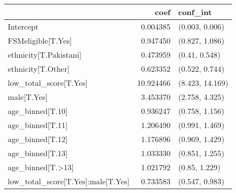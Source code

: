 \begin{tabular}{lrl}
\toprule
{} &       coef &         conf\_int \\
\midrule
Intercept                          &   0.004385 &   (0.003, 0.006) \\
FSMeligible[T.Yes]                 &   0.947450 &   (0.827, 1.086) \\
ethnicity[T.Pakistani]             &   0.473959 &    (0.41, 0.548) \\
ethnicity[T.Other]                 &   0.623352 &   (0.522, 0.744) \\
low\_total\_score[T.Yes]             &  10.924466 &  (8.423, 14.169) \\
male[T.Yes]                        &   3.453370 &   (2.758, 4.325) \\
age\_binned[T.10]                   &   0.936247 &   (0.758, 1.156) \\
age\_binned[T.11]                   &   1.206490 &   (0.991, 1.469) \\
age\_binned[T.12]                   &   1.176896 &   (0.969, 1.429) \\
age\_binned[T.13]                   &   1.033330 &   (0.851, 1.255) \\
age\_binned[T.>13]                  &   1.021792 &    (0.85, 1.229) \\
low\_total\_score[T.Yes]:male[T.Yes] &   0.733583 &   (0.547, 0.983) \\
\bottomrule
\end{tabular}
